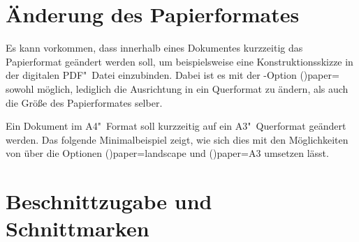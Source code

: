 \section{%
  Änderung des Papierformates%
}

Es kann vorkommen, dass innerhalb eines Dokumentes kurzzeitig das Papierformat 
geändert werden soll, um beispielsweise eine Konstruktionsskizze in der 
digitalen PDF"~Datei einzubinden. Dabei ist es mit der \KOMAScript-Option 
\Option(){paper=\PMisc} sowohl möglich, lediglich die 
Ausrichtung in ein Querformat zu ändern, als auch die Größe des Papierformates 
selber.
%
\begin{Example}
Ein Dokument im A4"~Format soll kurzzeitig auf ein A3"~Querformat geändert 
werden. Das folgende Minimalbeispiel zeigt, wie sich dies mit den Möglichkeiten 
von \KOMAScript über die Optionen \Option*(){paper=landscape} 
und \Option*(){paper=A3} umsetzen lässt.
\end{Example}



\section{%
  Beschnittzugabe und Schnittmarken%
  \label{sec:tips:crop}%
}

